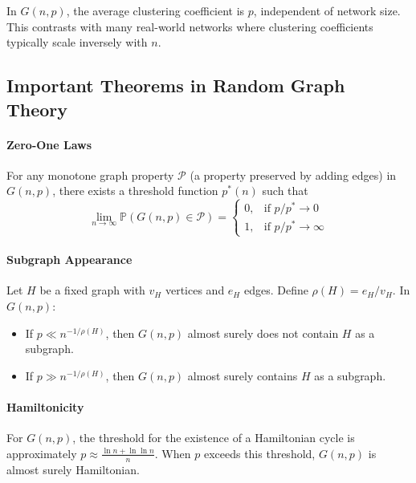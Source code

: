 \begin{theorem}
In $G(n,p)$, the average clustering coefficient is $p$, independent of network size. This contrasts with many real-world networks where clustering coefficients typically scale inversely with $n$.
\end{theorem}

\subsection{Important Theorems in Random Graph Theory}

\paragraph{Zero-One Laws}
\begin{theorem}
For any monotone graph property $\mathcal{P}$ (a property preserved by adding edges) in $G(n,p)$, there exists a threshold function $p^*(n)$ such that
\[
\lim_{n\to\infty} \mathbb{P}(G(n,p) \in \mathcal{P}) = 
\begin{cases}
0, & \text{if } p/p^* \to 0 \\
1, & \text{if } p/p^* \to \infty
\end{cases}
\]
\end{theorem}

\paragraph{Subgraph Appearance}
\begin{theorem}
Let $H$ be a fixed graph with $v_H$ vertices and $e_H$ edges. Define $\rho(H) = e_H/v_H$. In $G(n,p)$:
\begin{itemize}
\item If $p \ll n^{-1/\rho(H)}$, then $G(n,p)$ almost surely does not contain $H$ as a subgraph.
\item If $p \gg n^{-1/\rho(H)}$, then $G(n,p)$ almost surely contains $H$ as a subgraph.
\end{itemize}
\end{theorem}

\paragraph{Hamiltonicity}
\begin{theorem}
For $G(n,p)$, the threshold for the existence of a Hamiltonian cycle is approximately $p \approx \frac{\ln n + \ln \ln n}{n}$. When $p$ exceeds this threshold, $G(n,p)$ is almost surely Hamiltonian.
\end{theorem}

